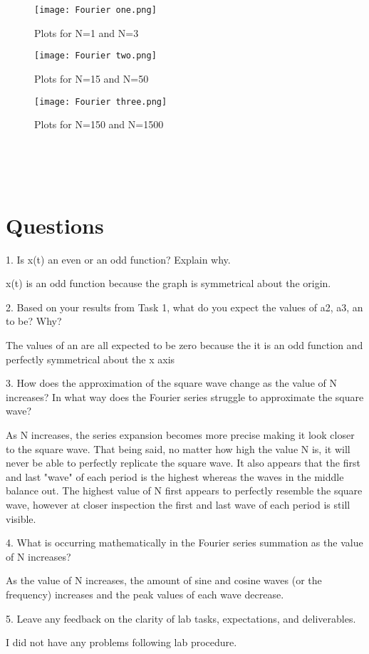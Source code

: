 \documentclass[12pt]{report}
\begin{document}
\begin{figure}[h!]
    \centering
    \texttt{[image: Fourier one.png]}
    \caption{Plots for N=1 and N=3}
    \label{Figure x:}
\end{figure}
\begin{figure}[h!]
    \centering
    \texttt{[image: Fourier two.png]}
    \caption{Plots for N=15 and N=50}
    \label{Figure x:}
\end{figure}
\begin{figure}[h!]
    \centering
    \texttt{[image: Fourier three.png]}
    \caption{Plots for N=150 and N=1500}
    \label{Figure x:}
\end{figure}
\\\\\\
\section{Questions}
\hspace{\parindent}1. Is x(t) an even or an odd function? Explain why.

x(t) is an odd function because the graph is symmetrical about the origin.

2. Based on your results from Task 1, what do you expect the values of a2, a3, an to be? Why?

The values of an are all expected to be zero because the it is an odd function and perfectly symmetrical about the x axis

3. How does the approximation of the square wave change as the value of N increases? In what way does the Fourier series struggle to approximate the square wave?

As N increases, the series expansion becomes more precise making it look closer to the square wave. That being said, no matter how high the value N is, it will never be able to perfectly replicate the square wave. It also appears that the first and last "wave" of each period is the highest whereas the waves in the middle balance out. The highest value of N first appears to perfectly resemble the square wave, however at closer inspection the first and last wave of each period is still visible.

4. What is occurring mathematically in the Fourier series summation as the value of N increases?

As the value of N increases, the amount of sine and cosine waves (or the frequency) increases and the peak values of each wave decrease.

5. Leave any feedback on the clarity of lab tasks, expectations, and deliverables.

I did not have any problems following lab procedure.
\end{document}

